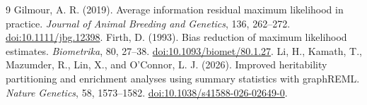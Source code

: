 \documentclass[11pt]{article}
\begin{document}
\begin{thebibliography}{9}
 Gilmour, A. R. (2019). Average information residual maximum likelihood in practice. \emph{Journal of Animal Breeding and Genetics}, 136, 262--272. \href{https://doi.org/10.1111/jbg.12398}{doi:10.1111/jbg.12398}.
 Firth, D. (1993). Bias reduction of maximum likelihood estimates. \emph{Biometrika}, 80, 27--38. \href{https://doi.org/10.1093/biomet/80.1.27}{doi:10.1093/biomet/80.1.27}.
 Li, H., Kamath, T., Mazumder, R., Lin, X., and O'Connor, L. J. (2026). Improved heritability partitioning and enrichment analyses using summary statistics with graphREML. \emph{Nature Genetics}, 58, 1573--1582. \href{https://doi.org/10.1038/s41588-026-02649-0}{doi:10.1038/s41588-026-02649-0}.
\end{thebibliography}
\end{document}
